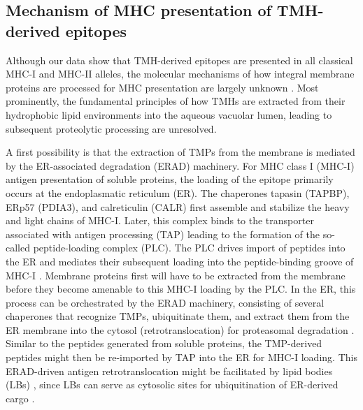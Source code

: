 \subsection{Mechanism of MHC presentation of TMH-derived epitopes}

Although our data show that 
TMH-derived epitopes are presented in all classical MHC-I and MHC-II alleles, 
the molecular mechanisms of how integral membrane proteins are processed 
for MHC presentation are largely unknown \cite{bianchi2017}. 
Most prominently, the fundamental principles of 
how TMHs are extracted from their hydrophobic lipid environments 
into the aqueous vacuolar lumen, 
leading to subsequent proteolytic processing are unresolved. 

A first possibility is that the extraction of TMPs from the membrane 
is mediated by the ER-associated degradation (ERAD) machinery. 
For MHC class I (MHC-I) antigen presentation of soluble proteins, 
the loading of the epitope primarily occurs at the endoplasmatic reticulum (ER). 
The chaperones tapasin (TAPBP), ERp57 (PDIA3), 
and calreticulin (CALR) \cite{rock2016present} first assemble 
and stabilize the heavy and light chains of MHC-I. 
Later, this complex binds to the transporter 
associated with antigen processing (TAP) 
leading to the formation of the so-called peptide-loading complex (PLC). 
The PLC drives import of peptides into the ER 
and mediates their subsequent loading into the peptide-binding groove of MHC-I \cite{blees2017structure}. 
Membrane proteins first will have to be extracted from the membrane 
before they become amenable to this MHC-I loading by the PLC. 
In the ER, this process can be orchestrated by the ERAD machinery, 
consisting of several chaperones that recognize TMPs, 
ubiquitinate them, and extract them from the ER membrane 
into the cytosol (retrotranslocation) for proteasomal degradation \cite{preston2017evolving,meusser2005erad}. 
Similar to the peptides generated from soluble proteins, 
the TMP-derived peptides might then be re-imported by TAP 
into the ER for MHC-I loading. 
This ERAD-driven antigen retrotranslocation might be facilitated by lipid bodies (LBs) \cite{bougneres2009role}, 
since LBs can serve as cytosolic sites for ubiquitination of ER-derived cargo \cite{fujimoto2006proteasomal}. 

